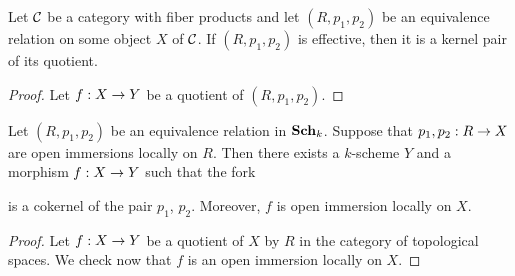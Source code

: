 \begin{proposition}
Let ${\mathcal C}$ be a category with fiber products and let $(R,p_1,p_2)$ be an equivalence relation on some object $X$ of ${\mathcal C}$. If $(R,p_1,p_2)$ is effective, then it is a kernel pair of its quotient.
\end{proposition}
\begin{proof}
Let $f:X\rightarrow Y$ be a quotient of $(R,p_1,p_2)$.
\end{proof}

\begin{theorem}
Let $(R, p_1, p_2)$ be an equivalence relation in $\mathbf{Sch}_k$. Suppose that $p_1, p_2:R\rightarrow X$ are open immersions locally on $R$. Then there exists a $k$-scheme $Y$ and a morphism $f:X\rightarrow Y$ such that the fork 
\begin{center}
\end{center}
is a cokernel of the pair $p_1$, $p_2$. Moreover, $f$ is open immersion locally on $X$.
\end{theorem}
\begin{proof}
Let $f:X\rightarrow Y$ be a quotient of $X$ by $R$ in the category of topological spaces. We check now that $f$ is an open immersion locally on $X$.
\end{proof}

\small




